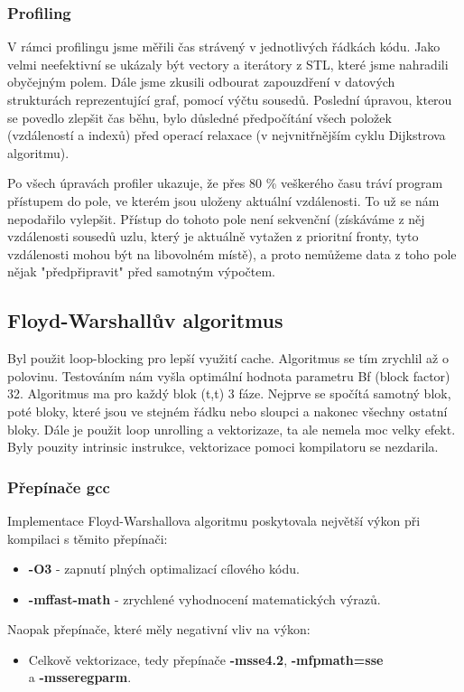 \documentclass[a4paper,11pt]{article}
\begin{document}
\subsubsection{Profiling}
V rámci profilingu jsme měřili čas strávený v jednotlivých řádkách kódu. Jako velmi neefektivní se ukázaly být vectory a iterátory z STL, které jsme nahradili obyčejným polem. Dále jsme zkusili odbourat zapouzdření v datových strukturách reprezentující graf, pomocí výčtu sousedů. Poslední úpravou, kterou se povedlo zlepšit čas běhu, bylo důsledné předpočítání všech položek (vzdáleností a indexů) před operací relaxace (v nejvnitřnějším cyklu Dijk\-strova algoritmu).
\par
Po všech úpravách profiler ukazuje, že přes 80 \% veškerého času tráví program přístupem do pole, ve kterém jsou uloženy aktuální vzdálenosti. To už se nám nepodařilo vylepšit. Přístup do tohoto pole není sekvenční (získáváme z něj vzdálenosti sousedů uzlu, který je aktuálně vytažen z prioritní fronty, tyto vzdálenosti mohou být na libovolném místě), a proto nemůžeme data z toho pole nějak "předpřipravit" před samotným výpočtem.

\subsection{Floyd-Warshallův algoritmus}
Byl použit loop-blocking pro lepší využití cache. Algoritmus se tím zrychlil až o polovinu. Testováním nám vyšla optimální hodnota parametru Bf (block factor) 32. Algoritmus ma pro každý blok (t,t) 3 fáze. Nejprve se spočítá samotný blok, poté bloky, které jsou ve stejném řádku nebo sloupci a nakonec všechny ostatní bloky. Dále je použit loop unrolling a vektorizaze, ta ale nemela moc velky efekt. Byly pouzity intrinsic instrukce, vektorizace pomoci kompilatoru se nezdarila.

\subsubsection{Přepínače gcc}
Implementace Floyd-Warshallova algoritmu poskytovala největší výkon při kompilaci s těmito přepínači:
\begin{itemize}
 \item \textbf{-O3} - zapnutí plných optimalizací cílového kódu.
 \item \textbf{-mffast-math} - zrychlené vyhodnocení matematických výrazů.
\end{itemize}
Naopak přepínače, které měly negativní vliv na výkon:
\begin{itemize}
  \item Celkově vektorizace, tedy přepínače \textbf{-msse4.2}, \textbf{-mfpmath=sse} \\a \textbf{-msseregparm}.
\end{itemize}
\end{document}
